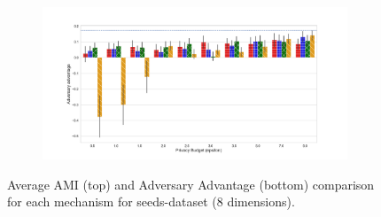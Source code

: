 \begin{figure}[H]
\begin{subfigure}{1\textwidth}
  \end{subfigure}
  \begin{subfigure}{1\textwidth}
    \includegraphics[width=1\textwidth]{Results/nd-laplace/attack_adv_seeds-dataset_comparison.png}
  \end{subfigure}
  \caption{Average AMI (top) and Adversary Advantage (bottom) comparison for each mechanism for seeds-dataset (8 dimensions).}
  \label{fig:utility_seeds-dataset_comparison_nd_plot}
\end{figure}
\newpage


